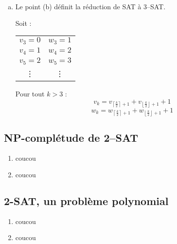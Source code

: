 \begin{enumerate}[(a)]
\item Le point (b) définit la réduction de SAT à 3--SAT.

Soit :
\begin{center}
\begin{tabular}{c c}
$v_3 = 0$ & $w_3 = 1$ \\
$v_4 = 1$ & $w_4 = 2$ \\
$v_5 = 2$ & $w_5 = 3$ \\
\vdots & \vdots
\end{tabular}
\end{center}

Pour tout $k > 3$ :
\[ v_k = v_{\left \lceil \frac{k}{2} \right \rceil + 1} + v_{\left \lfloor \frac{k}{2} \right \rfloor + 1} + 1 \]
\[ w_k = w_{\left \lceil \frac{k}{2} \right \rceil + 1} + w_{\left \lfloor \frac{k}{2} \right \rfloor + 1} + 1 \]
\end{enumerate}

\subsection{NP-complétude de 2--SAT}
\begin{enumerate}
\item coucou
\item coucou
\end{enumerate}

\subsection{2-SAT, un problème polynomial}
\begin{enumerate}
\item coucou
\item coucou
\end{enumerate}
